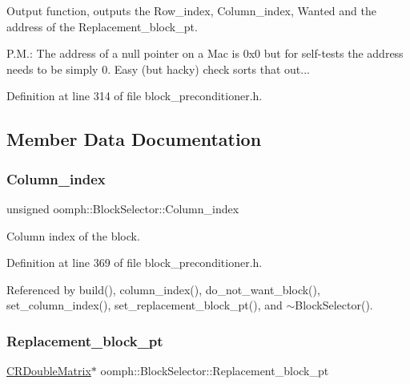 Output function, outputs the Row\+\_\+index, Column\+\_\+index, Wanted and the address of the Replacement\+\_\+block\+\_\+pt. 

P.\+M.\+: The address of a null pointer on a Mac is 0x0 but for self-\/tests the address needs to be simply 0. Easy (but hacky) check sorts that out... 

Definition at line 314 of file block\+\_\+preconditioner.\+h.



\subsection{Member Data Documentation}
\mbox{\label{classoomph_1_1BlockSelector_adac07173a35f4f7f28e67b4b62306777}} 
\subsubsection{\texorpdfstring{Column\+\_\+index}{Column\_index}}
{\footnotesize\ttfamily unsigned oomph\+::\+Block\+Selector\+::\+Column\+\_\+index\hspace{0.3cm}{\ttfamily [private]}}



Column index of the block. 



Definition at line 369 of file block\+\_\+preconditioner.\+h.



Referenced by build(), column\+\_\+index(), do\+\_\+not\+\_\+want\+\_\+block(), set\+\_\+column\+\_\+index(), set\+\_\+replacement\+\_\+block\+\_\+pt(), and $\sim$\+Block\+Selector().

\mbox{\label{classoomph_1_1BlockSelector_ad18ae2223ddfb1a1b61937930357bfc8}} 
\subsubsection{\texorpdfstring{Replacement\+\_\+block\+\_\+pt}{Replacement\_block\_pt}}
{\footnotesize\ttfamily \hyperlink{classoomph_1_1CRDoubleMatrix}{C\+R\+Double\+Matrix}$\ast$ oomph\+::\+Block\+Selector\+::\+Replacement\+\_\+block\+\_\+pt\hspace{0.3cm}{\ttfamily [private]}}



